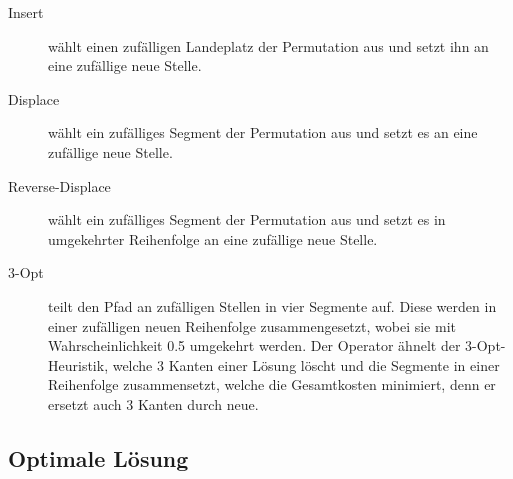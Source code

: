 \documentclass[a4paper,10pt,ngerman]{scrartcl}
\begin{document}
\begin{description}
  \item[Insert] wählt einen zufälligen Landeplatz der Permutation aus und setzt ihn an
    eine zufällige neue Stelle.
  \item[Displace] wählt ein zufälliges Segment der Permutation aus und setzt es an eine
    zufällige neue Stelle.
  \item[Reverse-Displace] wählt ein zufälliges Segment der Permutation aus und setzt es
    in umgekehrter Reihenfolge an eine zufällige neue Stelle.
  \item[3-Opt] teilt den Pfad an zufälligen Stellen in vier Segmente auf. Diese werden 
  in einer zufälligen neuen Reihenfolge zusammengesetzt, wobei sie mit Wahrscheinlichkeit 
  0.5 umgekehrt werden. Der Operator ähnelt der 3-Opt-Heuristik, welche 3 Kanten einer 
  Lösung löscht und die Segmente in einer Reihenfolge zusammensetzt, welche die Gesamtkosten 
  minimiert, denn er ersetzt auch 3 Kanten durch neue.
\end{description}
\subsection{Optimale Lösung}
\end{document}
